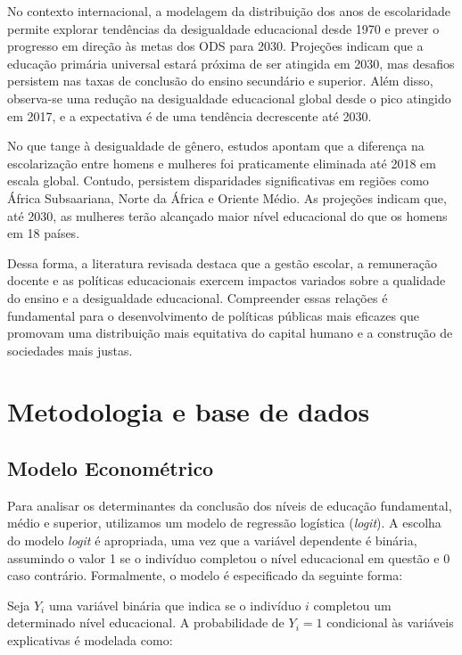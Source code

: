 \documentclass[a4paper,12pt]{article}
\begin{document}
No contexto internacional, a modelagem da distribuição dos anos de escolaridade permite explorar tendências da desigualdade educacional desde 1970 e prever o progresso em direção às metas dos ODS para 2030. Projeções indicam que a educação primária universal estará próxima de ser atingida em 2030, mas desafios persistem nas taxas de conclusão do ensino secundário e superior. Além disso, observa-se uma redução na desigualdade educacional global desde o pico atingido em 2017, e a expectativa é de uma tendência decrescente até 2030.

No que tange à desigualdade de gênero, estudos apontam que a diferença na escolarização entre homens e mulheres foi praticamente eliminada até 2018 em escala global. Contudo, persistem disparidades significativas em regiões como África Subsaariana, Norte da África e Oriente Médio. As projeções indicam que, até 2030, as mulheres terão alcançado maior nível educacional do que os homens em 18 países.

Dessa forma, a literatura revisada destaca que a gestão escolar, a remuneração docente e as políticas educacionais exercem impactos variados sobre a qualidade do ensino e a desigualdade educacional. Compreender essas relações é fundamental para o desenvolvimento de políticas públicas mais eficazes que promovam uma distribuição mais equitativa do capital humano e a construção de sociedades mais justas.
\newpage


\section{Metodologia e base de dados}


\subsection{Modelo Econométrico}

Para analisar os determinantes da conclusão dos níveis de educação fundamental, médio e superior, utilizamos um modelo de regressão logística (\textit{logit}). A escolha do modelo \textit{logit} é apropriada, uma vez que a variável dependente é binária, assumindo o valor 1 se o indivíduo completou o nível educacional em questão e 0 caso contrário. Formalmente, o modelo é especificado da seguinte forma:

Seja \( Y_i \) uma variável binária que indica se o indivíduo \( i \) completou um determinado nível educacional. A probabilidade de \( Y_i = 1 \) condicional às variáveis explicativas é modelada como:
\end{document}
